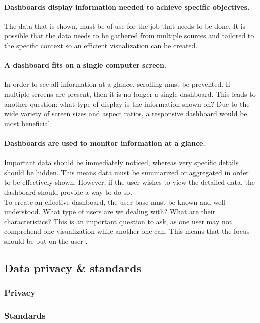     \paragraph{Dashboards display information needed to achieve specific objectives.} The data that is shown, must be of use for the job that needs to be done. It is possible that the data needs to be gathered from multiple sources and tailored to the specific context so an efficient visualization can be created.

    \paragraph{A dashboard fits on a single computer screen.} In order to see all information at a glance, scrolling must be prevented. If multiple screens are present, then it is no longer a single dashboard. This leads to another question: what type of display is the information shown on? Due to the wide variety of screen sizes and aspect ratios, a responsive dashboard would be most beneficial.

    \paragraph{Dashboards are used to monitor information at a glance.} Important data should be immediately noticed, whereas very specific details should be hidden. This means data must be summarized or aggregated in order to be effectively shown. However, if the user wishes to view the detailed data, the dashboard should provide a way to do so.\\

    \noindent To create an effective dashboard, the user-base must be known and well understood. What type of users are we dealing with? What are their characteristics? This is an important question to ask, as one user may not comprehend one visualization while another one can. This means that the focus should be put on the user \cite{brath2004dashboard}.
        

    \subsection{Data privacy \& standards}
        
        \subsubsection{Privacy} \label{2_privacy}

        \subsubsection{Standards} \label{2_standards}

    

        

        


